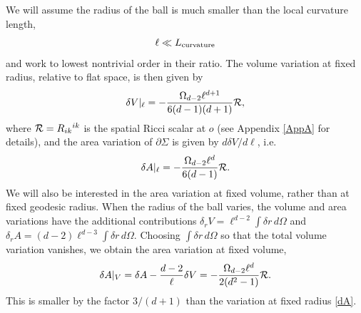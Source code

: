 \documentclass[aps,prd,showpacs,groupedaddress,nofootinbib,longbibliography,12pt]{revtex4-1}
\def\beq{\begin{equation}}
\def\eeq{\end{equation}}
\def\d{\delta}\def\D{\Delta}
\def\O{\Omega}
\begin{document}
We will assume the radius of the ball is much smaller than the local curvature length,
%
\beq
\ell\ll L_{\rm curvature}
\eeq
% 
and work to lowest nontrivial order in their ratio. 
The volume variation at fixed radius, relative to flat space, is then given by
%
\beq\label{dV}
\d V|_{\ell} = -\frac{\O_{d-2}\ell^{d+1}}{6(d-1)(d+1)}{\cal R},
\eeq
%
where ${\cal R}=R_{ik}{}^{ik}$ is the spatial Ricci scalar  at $o$ (see Appendix \ref{AppA} for details),
and the area variation of $\partial\Sigma$ is given by $d\d V/d\ell$, i.e.\ 
%
\beq\label{dA}
\d A|_{\ell} = -\frac{\O_{d-2} \ell^d }{6(d-1)}{\cal R}.
\eeq
%
We will also be interested in the area variation at fixed volume, rather than at fixed geodesic radius.
When the radius of the ball varies, the volume and area variations have the additional contributions
$\d_r V = \ell^{d-2}\int \d r\, d\O$ and $\d_r A = (d-2)\ell^{d-3}\int \d r\, d\O$.
Choosing $\int \d r\, d\O$ so that the total volume variation vanishes, 
we obtain the area variation at fixed volume,
%
\beq\label{dAV}
\d A|_V = \d A - \frac{d-2}{\ell}\d V=
-\frac{\O_{d-2}\ell^d}{2(d^2-1)} {\cal R}. 
\eeq
%
This is smaller  by the factor 
$3/(d+1)$ than the variation at fixed radius \eqref{dA}.
\end{document}
